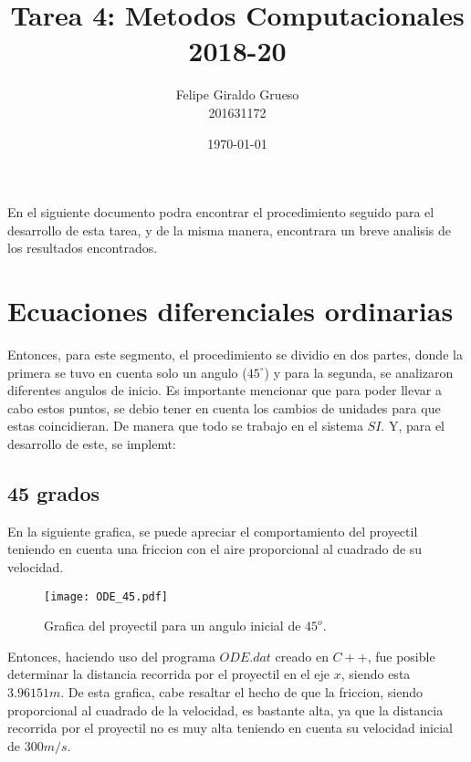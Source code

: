 \documentclass[11pt]{article}
\begin{document}
\title{Tarea 4: Metodos Computacionales \\ 2018-20}%

\author{Felipe Giraldo Grueso \\ 201631172}

\date{\today}

\maketitle

En el siguiente documento podra encontrar el procedimiento seguido para el desarrollo de esta tarea, y de la misma manera, encontrara un breve analisis de los resultados encontrados.

\section{Ecuaciones diferenciales ordinarias}

Entonces, para este segmento, el procedimiento se dividio en dos partes, donde la primera se tuvo en cuenta solo un angulo ($45^\circ$) y para la segunda, se analizaron diferentes angulos de inicio. Es importante mencionar que para poder llevar a cabo estos puntos, se debio tener en cuenta los cambios de unidades para que estas coincidieran. De manera que todo se trabajo en el sistema $SI$. Y, para el desarrollo de este, se implemt:
	
	\subsection{45 grados}

		En la siguiente grafica, se puede apreciar el comportamiento del proyectil teniendo en cuenta una friccion con el aire proporcional al cuadrado de su velocidad.
		\begin{figure}[H]
    			\begin{center}
    				\texttt{[image: ODE\_45.pdf]}
    				\caption{Grafica del proyectil para un angulo inicial de $45^o$.}
			\end{center}
    			\label{fig:45}
		\end{figure}

		Entonces, haciendo uso del programa $ODE.dat$ creado en $C++$, fue posible determinar la distancia recorrida por el proyectil en el eje $x$, siendo esta $3.96151 m$. De esta grafica, 			cabe resaltar el hecho de que la friccion, siendo proporcional al cuadrado de la velocidad, es bastante alta, ya que la distancia recorrida por el proyectil no es muy alta teniendo en 		cuenta su velocidad inicial de $300 m/s$.
\end{document}
